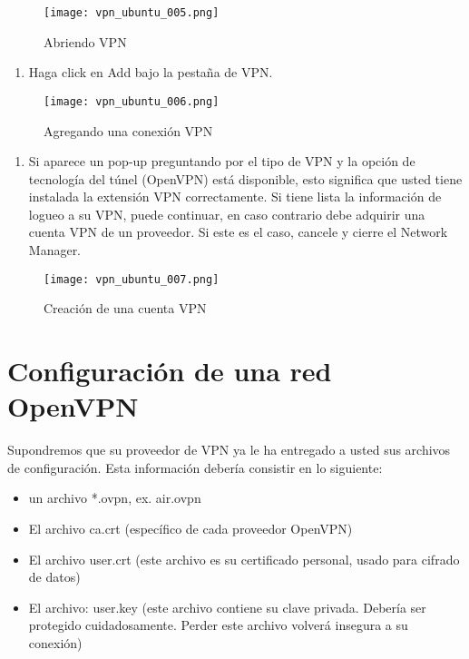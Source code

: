 \documentclass[10pt,a5paper,twoside,,]{book}
\providecommand{\tightlist}{%
  \setlength{\itemsep}{0pt}\setlength{\parskip}{0pt}}
\begin{document}
\begin{figure}[htbp]
\centering
\texttt{[image: vpn\_ubuntu\_005.png]}
\caption{Abriendo VPN}
\end{figure}

\begin{enumerate}
\def\labelenumi{\arabic{enumi}.}
\setcounter{enumi}{5}
\tightlist
\item
  Haga click en Add bajo la pestaña de VPN.
\end{enumerate}

\begin{figure}[htbp]
\centering
\texttt{[image: vpn\_ubuntu\_006.png]}
\caption{Agregando una conexión VPN}
\end{figure}

\begin{enumerate}
\def\labelenumi{\arabic{enumi}.}
\setcounter{enumi}{6}
\tightlist
\item
  Si aparece un pop-up preguntando por el tipo de VPN y la opción de
  tecnología del túnel (OpenVPN) está disponible, esto significa que
  usted tiene instalada la extensión VPN correctamente. Si tiene lista
  la información de logueo a su VPN, puede continuar, en caso contrario
  debe adquirir una cuenta VPN de un proveedor. Si este es el caso,
  cancele y cierre el Network Manager.
\end{enumerate}

\begin{figure}[htbp]
\centering
\texttt{[image: vpn\_ubuntu\_007.png]}
\caption{Creación de una cuenta VPN}
\end{figure}

\section{Configuración de una red
OpenVPN}\label{configuraciuxf3n-de-una-red-openvpn}

Supondremos que su proveedor de VPN ya le ha entregado a usted sus
archivos de configuración. Esta información debería consistir en lo
siguiente:

\begin{itemize}
\tightlist
\item
  un archivo *.ovpn, ex. air.ovpn
\item
  El archivo ca.crt (específico de cada proveedor OpenVPN)
\item
  El archivo user.crt (este archivo es su certificado personal, usado
  para cifrado de datos)
\item
  El archivo: user.key (este archivo contiene su clave privada. Debería
  ser protegido cuidadosamente. Perder este archivo volverá insegura a
  su conexión)
\end{itemize}
\end{document}
